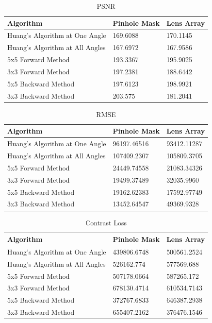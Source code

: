 \begin{table}[]
  \centering
     \caption {PSNR}
    \begin{tabular}{| p{4 cm} | p{4 cm} | p{4cm} |}
    \hline Algorithm & Pinhole Mask & Lens Array \\
    \hline Huang's Algorithm at One Angle & 169.6088 & 170.1145 \\
    \hline Huang's Algorithm at All Angles & 167.6972 & 167.9586 \\
    \hline 5x5 Forward Method & 193.3367 & 195.9025 \\
    \hline 3x3 Forward Method & 197.2381 & 188.6442 \\ 
    \hline 5x5 Backward Method & 197.6123 & 198.9921 \\
    \hline 3x3 Backward Method & 203.575 & 181.2041 \\ \hline
    \end{tabular}
\end{table}

\begin{table}[]
  \centering
     \caption {RMSE}
     \begin{tabular}{| p{4 cm} | p{4 cm} | p{4cm} |}
    \hline Algorithm & Pinhole Mask & Lens Array \\
    \hline Huang's Algorithm at One Angle & 96197.46516 & 93412.11287 \\
    \hline Huang's Algorithm at All Angles & 107409.2307 & 105809.3705 \\
    \hline 5x5 Forward Method & 24449.74558 & 21083.34326 \\
    \hline 3x3 Forward Method & 19499.37489  & 32035.9960  \\ 
    \hline 5x5 Backward Method & 19162.62383 & 17592.97749 \\
    \hline 3x3 Backward Method & 13452.64547 & 49369.9328 \\ \hline
    \end{tabular}
\end{table}

\begin{table}[]
  \centering
     \caption {Contrast Loss}
     \begin{tabular}{| p{4 cm} | p{4 cm} | p{4cm} |}
    \hline Algorithm & Pinhole Mask & Lens Array \\
    \hline Huang's Algorithm at One Angle & 439806.6748 & 500561.2524 \\
    \hline Huang's Algorithm at All Angles & 526162.774 & 577569.688 \\
    \hline 5x5 Forward Method & 507178.0664 & 587265.172 \\
    \hline 3x3 Forward Method & 678130.4714  &  610534.7143 \\ 
    \hline 5x5 Backward Method & 372767.6833 & 646387.2938 \\
    \hline 3x3 Backward Method & 655407.2162 & 376476.1546 \\ \hline
    \end{tabular}
\end{table}

